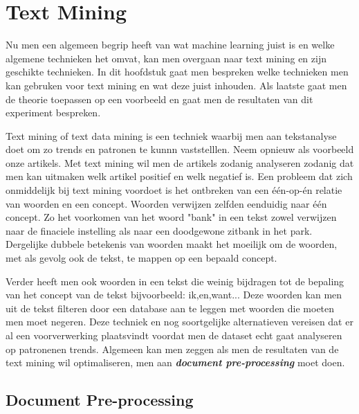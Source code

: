 \chapter{Text Mining}\label{Text Mining}

Nu men een algemeen begrip heeft van wat machine learning juist is en welke algemene technieken het omvat, kan men overgaan naar text mining en zijn geschikte technieken. In dit hoofdstuk gaat men bespreken welke technieken men kan gebruken voor text mining en wat deze juist inhouden. Als laatste gaat men de theorie toepassen op een voorbeeld en gaat men de resultaten van dit experiment bespreken. 


Text mining of text data mining is een techniek waarbij men aan tekstanalyse doet om zo trends en patronen te kunnn vaststelllen. Neem opnieuw als voorbeeld onze artikels. Met text mining wil men de artikels zodanig analyseren zodanig dat men kan uitmaken welk artikel positief en welk negatief is.
Een probleem dat zich onmiddelijk bij text mining voordoet is het ontbreken van een  \'e\'en-op-\'en relatie van woorden en een concept. Woorden verwijzen zelfden eenduidig naar één concept. Zo het voorkomen van het woord "bank" in een tekst zowel verwijzen naar de finaciele instelling als naar een doodgewone zitbank in het park. Dergelijke dubbele betekenis van woorden maakt het moeilijk om de woorden, met als gevolg ook de tekst, te mappen op een bepaald concept.

Verder heeft men ook woorden in een tekst die weinig bijdragen tot de bepaling van het concept van de tekst bijvoorbeeld: ik,en,want...
Deze woorden kan men uit de tekst filteren door een database aan te leggen met woorden die moeten men moet negeren. Deze techniek en nog soortgelijke alternatieven vereisen dat er al een voorverwerking plaatsvindt voordat men de dataset echt gaat analyseren op patronenen trends. Algemeen kan men zeggen als men de resultaten van de text mining wil optimaliseren, men aan \textbf{\textit{document pre-processing}} moet doen.

\section{Document Pre-processing }\label{Document Pre-processing}

